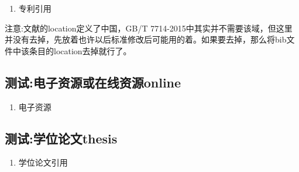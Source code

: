 \begin{refsection}

\begin{enumerate}
  \item 专利引用\cite{KOSEKI2002--,TACHIBANA2002--,河北绿洲生态环境科技有限公司2001--,姜锡洲1989--,刘加林1993--,西安电子科技大学2002--,张凯军2012-04-05--}
\end{enumerate}

注意:文献\cite{刘加林1993--}的location定义了中国，GB/T 7714-2015中其实并不需要该域，但这里并没有去掉，先放着也许以后标准修改后可能用的着。如果要去掉，那么将bib文件中该条目的location去掉就行了。

\printbibliography[heading=bibliography,title=【专利】]
\end{refsection}

\subsection{测试:电子资源或在线资源online}

\begin{refsection}

\begin{enumerate}
  \item 电子资源\cite{Commonwealth--,HOPKINSON--,OMG2003--,OCLC--,李强2012-05-03--,萧钰2001--,Alliance--,Dublin2012-06-14--,JabRef中文手册--,1989--}
\end{enumerate}


\printbibliography[heading=bibliography,title=【电子资源】]
\end{refsection}


\subsection{测试:学位论文thesis}

\begin{refsection}
\begin{enumerate}
  \item 学位论文引用\cite{CALMS1965--,马欢2011-27-27,吴云芳2003--,张若凌2004--,张志祥1998--}
\end{enumerate}

\printbibliography[heading=bibliography,title=【硕博士论文】]
\end{refsection}


